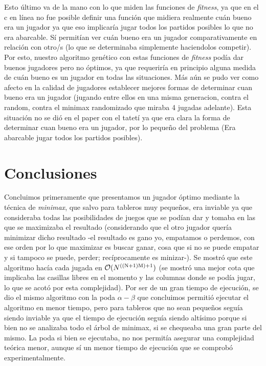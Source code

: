 \documentclass[A4paper,oneside,fleqn,11pt]{article}
\theoremstyle{definition}
\begin{document}
Esto último va de la mano con lo que miden las funciones de \textit{fitness}, ya que en el c en línea no fue posible definir una función que midiera realmente cuán bueno era un jugador ya que eso implicaría jugar todos los partidos posibles lo que no era abarcable. Sí permitían ver cuán bueno era un jugador comparativamente en relación con otro/s (lo que se determinaba simplemente haciendolos competir). Por esto, nuestro algoritmo genético con estas funciones de \textit{fitness} podía dar buenos jugadores pero no óptimos, ya que requeriría en principio alguna medida de cuán bueno es un jugador en todas las situaciones. Más aún se pudo ver como afecto en la calidad de jugadores establecer mejores formas de determinar cuan bueno era un jugador (jugando entre ellos en una misma generacion, contra el random, contra el minimax randomizado que miraba 4 jugadas adelante). Esta situación no se dió en el paper con el tatetí ya que era clara la forma de determinar cuan bueno era un jugador, por lo pequeño del problema (Era abarcable jugar todos los partidos posibles).

\section{Conclusiones}

Concluimos primeramente que presentamos un jugador óptimo mediante la técnica de\textit{ minimax}, que salvo para tableros muy pequeños, era inviable ya que consideraba todas las posibilidades de juegos que se podían dar y tomaba en las que se maximizaba el resultado (considerando que el otro jugador quería minimizar dicho resultado -el resultado es gano yo, empatamos o perdemos, con ese orden por lo que maximizar es buscar ganar, cosa que si no se puede empatar y si tampoco se puede, perder; recíprocamente es minizar-). Se mostró que este algoritmo hacía cada jugada en $\mathcal{O}(N\textsuperscript{((N+1)M)+1})$ (se mostró una mejor cota que implicaba las casillas libres en el momento y las columnas donde se podía jugar, lo que se acotó por esta complejidad). Por ser de un gran tiempo de ejecución, se dio el mismo algoritmo con la poda $\alpha - \beta$ que concluimos permitió ejecutar el algoritmo en menor tiempo, pero para tableros que no sean pequeños seguía siendo inviable ya que el tiempo de ejecución seguía siendo altísimo porque si bien no se analizaba todo el árbol de minimax, si se chequeaba una gran parte del mismo. La poda si bien se ejecutaba, no nos permitía asegurar una complejidad teórica menor, aunque sí un menor tiempo de ejecución que se comprobó experimentalmente.
\end{document}
